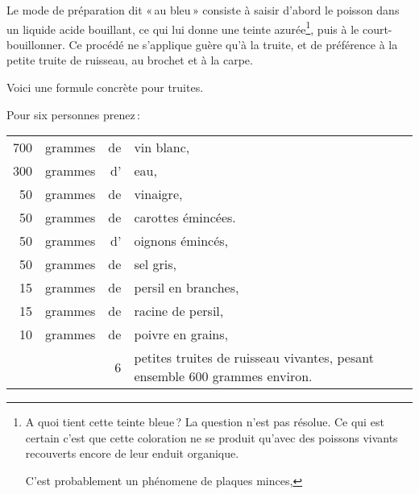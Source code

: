 Le mode de préparation dit « au bleu » consiste à saisir d'abord le poisson
dans un liquide acide bouillant, ce qui lui donne une teinte azurée\footnote{A
quoi tient cette teinte bleue ? La question n'est pas résolue. Ce qui est
certain c'est que cette coloration ne se produit qu'avec des poissons vivants
recouverts encore de leur enduit organique.

C'est probablement un phénomene de plaques minces,}, puis à le
court-bouillonner. Ce procédé ne s'applique guère qu'à la truite, et de
préférence à la petite truite de ruisseau, au brochet et à la carpe.

Voici une formule concrète pour truites.

\medskip

Pour six personnes prenez :

\medskip

\footnotesize
\begin{longtable}{rrrp{16em}}
    700 & grammes & de & vin blanc,                                                                       \\
    300 & grammes & d' & eau,                                                                             \\
     50 & grammes & de & vinaigre,                                                                        \\
     50 & grammes & de & carottes émincées.                                                               \\
     50 & grammes & d' & oignons émincés,                                                                 \\
     50 & grammes & de & sel gris,                                                                        \\
     15 & grammes & de & persil en branches,                                                              \\
     15 & grammes & de & racine de persil,                                                                \\
     10 & grammes & de & poivre en grains,                                                                \\
        &         &  6 & petites truites de ruisseau vivantes, pesant ensemble 600
                         grammes environ.                                                                 \\
\end{longtable}
\normalsize

